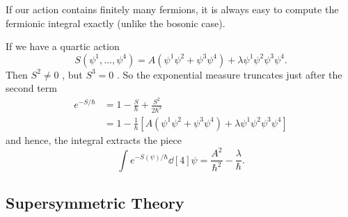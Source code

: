 
If our action contains finitely many fermions, it is always easy to compute the fermionic integral exactly (unlike the bosonic case).
\begin{example}[]
  If we have a quartic action 
  \begin{equation}
    S(\psi^1, \dots, \psi^4) = A(\psi^1 \psi^2 + \psi^3 \psi^4) + \lambda \psi^1 \psi^2 \psi^3 \psi^4.
  \end{equation}
  Then $S^2 \neq 0$ , but $S^3 = 0$ . So the exponential measure truncates just after the second term
  \begin{align}
    e^{-S / \hbar} &= 1 - \frac{S}{\hbar} + \frac{S^2}{2\hbar^2} \\
		   &=1 - \frac{1}{\hbar} [A (\psi^1 \psi^2 + \psi^3 \psi^4) + \lambda \psi^1 \psi^2 \psi^3 \psi^4]
  \end{align}
  and hence, the integral extracts the piece
  \begin{equation}
    \int e^{-S (\psi) / \hbar} \dd[4]{\psi} = \frac{A^2}{\hbar^2} - \frac{\lambda}{\hbar}.
  \end{equation}
\end{example}

\subsection{Supersymmetric Theory}%
\label{sub:supersymmetric_theory}

